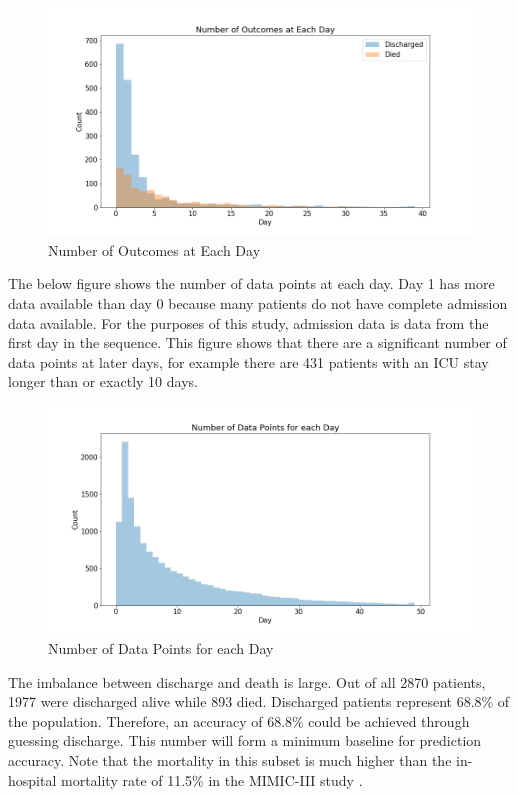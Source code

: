 \documentclass[12pt]{article}
\begin{document}
\begin{figure}[H]
\centering\caption{Number of Outcomes at Each Day}
\includegraphics[scale=0.5]{Number of Outcomes at Each Day.png}
\end{figure}
The below figure shows the number of data points at each day. Day 1 has more data available than day 0 because many patients do not have complete admission data available. For the purposes of this study, admission data is data from the first day in the sequence. This figure shows that there are a significant number of data points at later days, for example there are 431 patients with an ICU stay longer than or exactly 10 days.

\begin{figure}[H]
\centering\caption{Number of Data Points for each Day}
\includegraphics[scale=0.5]{Number of Data Points for each Day.png}
\end{figure}
The imbalance between discharge and death is large. Out of all 2870 patients, 1977 were discharged alive while 893 died. Discharged patients represent 68.8\% of the population. Therefore, an accuracy of 68.8\% could be achieved through guessing discharge. This number will form a minimum baseline for prediction accuracy. Note that the mortality in this subset is much higher than the in-hospital mortality rate of 11.5\% in the MIMIC-III study \cite{MIMICIIIdatabase}. 
\end{document}
